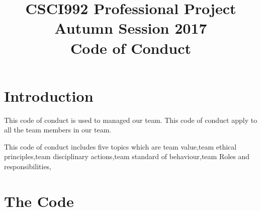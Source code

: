 \documentclass[11pt]{article}
\begin{document}
 

\title{\LARGE\textbf{CSCI992 Professional Project \\Autumn Session 2017
\\
Code of Conduct}}
\author{}	
\maketitle
\newpage
\tableofcontents
\newpage
\setcounter{page}{1}
\pagestyle{plain}
\section{Introduction}
\par
\par
This code of conduct is used to managed our team. This code of conduct apply to all the team members in our team.
\newline
\par This code of conduct includes five topics which are team value,team ethical principles,team disciplinary actions,team standard of behaviour,team Roles and responsibilities,

\par\setlength\parindent{2em}
\par\setlength\parindent{2em}
\par\setlength\parindent{2em}	
\section{The Code} 
\end{document}
